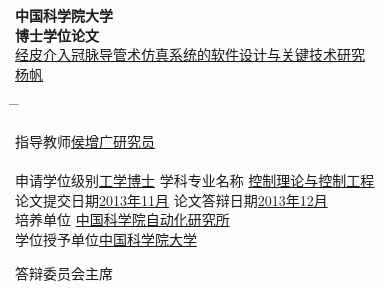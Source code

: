 \vspace*{1.7cm} %
\begin{center}
{\Huge \song \textbf{中国科学院大学}}\\
\vspace{0.8cm} {\Huge \song \textbf{博士学位论文}}\\
\vspace{1.8cm}
{\xiaoerhao \song \underline{经皮介入冠脉导管术仿真系统的软件设计与关键技术研究}}\\
\vspace{1.1cm} {\sanhao \underline{\;杨\;\;\;帆\;}}\\
\end{center}
\sanhao \vspace{1.2cm}
\begin{tabbing}
\hspace*{-0.8cm} \= \hspace{6.4cm} \= \kill

\>指导教师\underline{\hspace{4.8cm}侯增广\;\;研究员\hspace{4.6cm}}\\

\>\hspace{2.0cm} \underline{\hspace{13.1cm}}\\

\>申请学位级别\underline{\hspace{0.5cm}工学博士\hspace{0.5cm}} \>学科专业名称 \underline{\hspace{0.2cm}控制理论与控制工程\hspace{0.2cm}}\\

\>论文提交日期\underline{\hspace{0.3cm}2013年11月\hspace{0.3cm}} \> 论文答辩日期\underline{\hspace{1.4cm}2013年12月\hspace{1.4cm}}\\

\>培养单位 \underline{\hspace{3.5cm}中国科学院自动化研究所 \hspace{3.5cm}} \\

\>学位授予单位\underline{\hspace{3.5cm}中国科学院大学 \hspace{4.6cm}} \\
\end{tabbing}
\vspace{0.5cm}
\hspace*{7.1cm}答辩委员会主席\underline{\hspace{3.4cm}}
